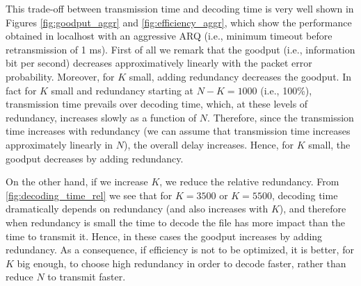 This trade-off between transmission time and decoding time is very well shown in Figures \ref{fig:goodput_aggr} and \ref{fig:efficiency_aggr}, which show the performance obtained in localhost with an aggressive ARQ (i.e., minimum timeout before retransmission of 1 ms). First of all we remark that the goodput (i.e., information bit per second) decreases approximatively linearly with the packet error probability. Moreover, for $K$ small, adding redundancy decreases the goodput. In fact for $K$ small and redundancy starting at $N-K=1000$ (i.e., 100\%), transmission time prevails over decoding time, which, at these levels of redundancy, increases slowly as a function of $N$. Therefore, since the transmission time increases with redundancy (we can assume that transmission time increases approximately linearly in $N$), the overall delay increases. Hence, for $K$ small, the goodput decreases by adding redundancy.

On the other hand, if we increase $K$, we reduce the relative redundancy. From \ref{fig:decoding_time_rel} we see that for $K=3500$ or $K=5500$, decoding time dramatically depends on redundancy (and also increases with $K$), and therefore when redundancy is small the time to decode the file has more impact than the time to transmit it. Hence, in these cases the goodput increases by adding redundancy.  As a consequence, if efficiency is not to be optimized, it is better, for $K$ big enough, to choose high redundancy in order to decode faster, rather than reduce $N$ to transmit faster.

